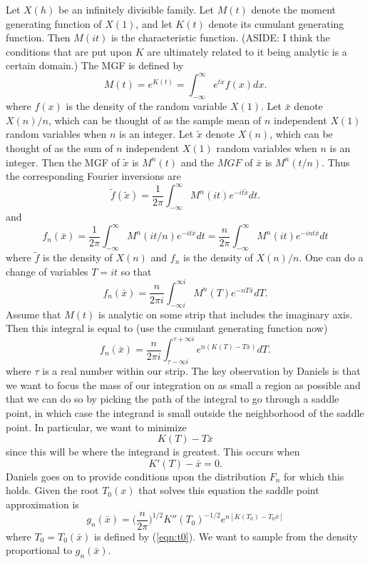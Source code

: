 \documentclass[12pt]{article}
\begin{document}
Let $X(h)$ be an infinitely divisible family.  Let $M(t)$ denote the moment
generating function of $X(1)$, and let $K(t)$ denote its cumulant generating
function.  Then $M(it)$ is the characteristic function.  (ASIDE: I think the
conditions that are put upon $K$ are ultimately related to it being analytic is
a certain domain.)  The MGF is defined by
\[
M(t) = e^{K(t)} = \int_{-\infty}^\infty e^{tx} f(x) dx.
\]
where $f(x)$ is the density of the random variable $X(1)$.  Let $\bar x$ denote
$X(n)/n$, which can be thought of as the sample mean of $n$ independent $X(1)$
random variables when $n$ is an integer.  Let $\tilde x$ denote $X(n)$, which
can be thought of as the sum of $n$ independent $X(1)$ random variables when $n$
is an integer.  Then the MGF of $\tilde x$ is $M^n(t)$ and the $MGF$ of $\bar x$
is $M^n(t/n)$.  Thus the corresponding Fourier inversions are
\[
\tilde f(\tilde x) = \frac{1}{2\pi} \int_{-\infty}^{\infty} M^n(i t) e^{-i t
  \tilde x} dt.
\]
and
\[
f_n(\bar x) = \frac{1}{2 \pi} \int_{-\infty}^{\infty} M^n(i t/n) e^{-i t \bar x}
d t 
=  \frac{n}{2 \pi} \int_{-\infty}^{\infty} M^n(i t) e^{-i n t \bar x}
d t 
\]
where $\tilde f$ is the density of $X(n)$ and $f_n$ is the density of $X(n)/n$.
One can do a change of variables $T = it$ so that
\[
f_n(\bar x) = \frac{n}{2 \pi i} \int_{-\infty i}^{\infty i} M^n(T) e^{-n T \bar x} dT.
\]
Assume that $M(t)$ is analytic on some strip that includes the imaginary axis.
Then this integral is equal to (use the cumulant generating function now)
\[
f_n(\bar x) = \frac{n}{2 \pi i} \int_{\tau -\infty i}^{\tau + \infty i} e^{n (
  K(T) - T \bar x)} dT.
\]
where $\tau$ is a real number within our strip.  
The key observation by Daniels is that we want to focus the mass of our
integration on as small a region as possible and that we can do so by picking
the path of the integral to go through a saddle point, in which case the
integrand is small outside the neighborhood of the saddle point.  In particular,
we want to minimize
\[
K(T) - T \bar x
\]
since this will be where the integrand is greatest.  This occurs when
\begin{equation}
\label{eqn:t0}
K'(T) - \bar x = 0.
\end{equation}
Daniels goes on to provide conditions upon the distribution $F_n$ for which this
holds.  Given the root $T_0(x)$ that solves this equation the saddle point
approximation is
\[
g_n(\bar x) = \Big( \frac{n}{2 \pi} \Big)^{1/2} K''(T_0)^{-1/2} e^{n [K(T_0) - T_0
  \bar x]}
\]
where $T_0 = T_0(\bar x)$ is defined by (\ref{eqn:t0}).  We want to sample from
the density proportional to $g_n(\bar x)$.
\end{document}
